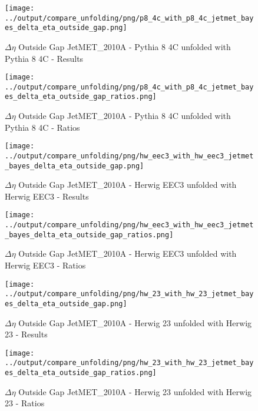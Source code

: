 \documentclass[11pt]{book}
\begin{document}
\begin{figure}[ht]
\centering
\texttt{[image: ../output/compare\_unfolding/png/p8\_4c\_with\_p8\_4c\_jetmet\_bayes\_delta\_eta\_outside\_gap.png]}
\caption{$\Delta\eta$ Outside Gap JetMET\_2010A - Pythia 8 4C unfolded with Pythia 8 4C - Results}
\label{p8_p8_jetmet_bayes_delta_eta_outside_gap_a}
\end{figure}

\begin{figure}[ht]
\centering
\texttt{[image: ../output/compare\_unfolding/png/p8\_4c\_with\_p8\_4c\_jetmet\_bayes\_delta\_eta\_outside\_gap\_ratios.png]}
\caption{$\Delta\eta$ Outside Gap JetMET\_2010A - Pythia 8 4C unfolded with Pythia 8 4C - Ratios}
\label{p8_p8_jetmet_bayes_delta_eta_outside_gap_b}
\end{figure}

\begin{figure}[ht]
\centering
\texttt{[image: ../output/compare\_unfolding/png/hw\_eec3\_with\_hw\_eec3\_jetmet\_bayes\_delta\_eta\_outside\_gap.png]}
\caption{$\Delta\eta$ Outside Gap JetMET\_2010A - Herwig EEC3 unfolded with Herwig EEC3 - Results}
\label{hw_eec3_hw_eec3_jetmet_bayes_delta_eta_outside_gap_a}
\end{figure}

\begin{figure}[ht]
\centering
\texttt{[image: ../output/compare\_unfolding/png/hw\_eec3\_with\_hw\_eec3\_jetmet\_bayes\_delta\_eta\_outside\_gap\_ratios.png]}
\caption{$\Delta\eta$ Outside Gap JetMET\_2010A - Herwig EEC3 unfolded with Herwig EEC3 - Ratios}
\label{hw_eec3_hw_eec3_jetmet_bayes_delta_eta_outside_gap_b}
\end{figure}

\begin{figure}[ht]
\centering
\texttt{[image: ../output/compare\_unfolding/png/hw\_23\_with\_hw\_23\_jetmet\_bayes\_delta\_eta\_outside\_gap.png]}
\caption{$\Delta\eta$ Outside Gap JetMET\_2010A - Herwig 23 unfolded with Herwig 23 - Results}
\label{hw_23_hw_23_jetmet_bayes_delta_eta_outside_gap_a}
\end{figure}

\begin{figure}[ht]
\centering
\texttt{[image: ../output/compare\_unfolding/png/hw\_23\_with\_hw\_23\_jetmet\_bayes\_delta\_eta\_outside\_gap\_ratios.png]}
\caption{$\Delta\eta$ Outside Gap JetMET\_2010A - Herwig 23 unfolded with Herwig 23 - Ratios}
\label{hw_23_hw_23_jetmet_bayes_delta_eta_outside_gap_b}
\end{figure}
\end{document}
